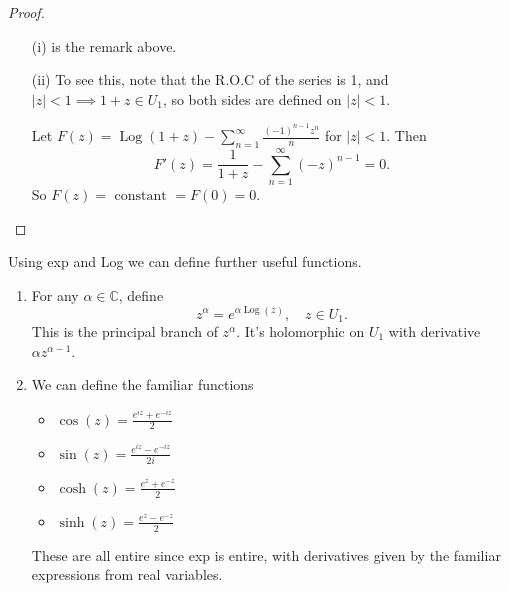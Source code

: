 \documentclass[a4paper]{scrartcl}
\begin{document}
\begin{proof}
      \begin{itemize}
           \item[(i)] is the remark above. 
           \item[(ii)] To see this, note that the R.O.C of the series is 1, and $|z|<1 \implies 1+z \in U_1 $, so both sides are defined on $|z|<1$. 
           
           Let $F (z)=\operatorname{Log}(1+z)-\sum_{n=1}^{ \infty} \frac{(-1)^{n-1}z^{n}}{n}$ for $|z|<1$. Then \[
           F' (z)= \frac{1}{1+z}-\sum_{n=1}^{ \infty}(-z)^{n-1}=0
           .\] So $F (z)=\text{ constant } =F (0)=0$.
      \end{itemize}
\end{proof}
Using exp and Log we can define further useful functions. 
\begin{enumerate}
     \item For any $\alpha \in \mathbb{C}$, define \[
     z^{\alpha}=e^{\alpha \operatorname{Log}(z)}, \quad z \in U_1 
     .\] This is the principal branch of $z^{\alpha}$. It's holomorphic on $U_1 $ with derivative $\alpha z^{\alpha-1}$. 
     \item We can define the familiar functions 
     \begin{itemize}
          \item $\cos (z)= \frac{e^{iz}+e^{-iz}}{2}$ 
          \item $\sin (z)= \frac{e^{iz}-e^{-iz}}{2i}$ 
          \item $\cosh (z)= \frac{e^{z}+e^{-z}}{2}$ 
          \item $\sinh (z)= \frac{e^{z}-e^{-z}}{2}$ 
     \end{itemize}
     These are all entire since exp is entire, with derivatives given by the familiar expressions from real variables.
\end{enumerate}
\end{document}

